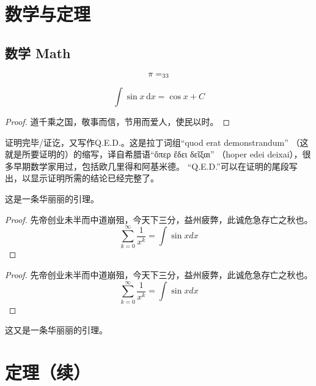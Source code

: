 \documentclass[oneside]{fduthesis}
\begin{document}
\chapter{数学与定理}
\section{数学 Math}
\[\pi=\sb{33}\]

\[
  \int\sin x\,\mathrm{d}x=\cos x + C
\]

\begin{proof}
道千乘之国，敬事而信，节用而爱人，使民以时。
\end{proof}

\begin{definition}
证明完毕/证讫，又写作Q.E.D.。这是拉丁词组“quod erat demonstrandum”
（这就是所要证明的）的缩写，译自希腊语“ὅπερ ἔδει δεῖξαι”
（hoper edei deixai），很多早期数学家用过，包括欧几里得和阿基米德。
“Q.E.D.”可以在证明的尾段写出，以显示证明所需的结论已经完整了。
\end{definition}

\begin{lemma}
  这是一条华丽丽的引理。
\end{lemma}

\begin{proof}
先帝创业未半而中道崩殂，今天下三分，益州疲弊，此诚危急存亡之秋也。
\begin{equation}
  \sum_{k=0}^{\infty} \frac{1}{x^k} = \int \sin x dx
\end{equation}
\end{proof}

\begin{proof}
先帝创业未半而中道崩殂，今天下三分，益州疲弊，此诚危急存亡之秋也。
\begin{equation*}
  \sum_{k=0}^{\infty} \frac{1}{x^k} = \int \sin x dx
\end{equation*}
\end{proof}

\begin{lemma}
  这又是一条华丽丽的引理。
\end{lemma}

\chapter{定理（续）}

\end{document}
